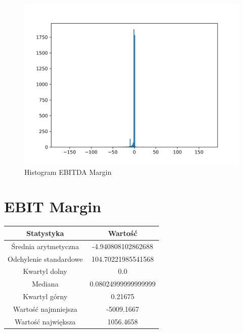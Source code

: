 \documentclass{article}
\begin{document}
\begin{figure}[h!]
    \includegraphics[width=\linewidth]{variables/EBITDA Margin.png}
    \caption{Histogram EBITDA Margin }
\end{figure}\section{ EBIT Margin }

\begin{center}
    \begin{tabular}{|c | c|} 
    \hline
    Statystyka & Wartość \\
    \hline\hline
    Średnia arytmetyczna & -4.940808102862688 \\ 
    \hline
    Odchylenie standardowe & 104.70221985541568 \\
    \hline
    Kwartyl dolny & 0.0 \\
    \hline
    Mediana & 0.08024999999999999 \\
    \hline
    Kwartyl górny & 0.21675 \\
    \hline
    Wartość najmniejsza & -5009.1667 \\
    \hline
    Wartość największa & 1056.4658 \\
    \hline
   \end{tabular}
\end{center}
\end{document}
